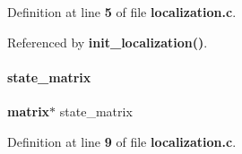 Definition at line \textbf{ 5} of file \textbf{ localization.\+c}.



Referenced by \textbf{ init\+\_\+localization()}.

\mbox{\label{localization_8c_a424e677cc0238390cb4a3068a6f3518c}} 
\paragraph{state\+\_\+matrix}
{\footnotesize\ttfamily \textbf{ matrix}$\ast$ state\+\_\+matrix}



Definition at line \textbf{ 9} of file \textbf{ localization.\+c}.

